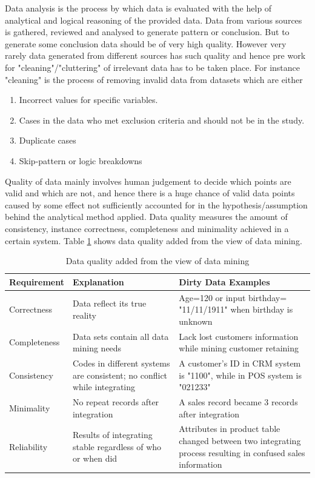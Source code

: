 \documentclass[article,type=msc,colorback,accentcolor=tud9c,twoside,11pt]{tudthesis}
\begin{document}
Data analysis is the process by which data is evaluated with the help of analytical and logical reasoning of the provided data. Data from various sources is gathered, reviewed and analysed to generate pattern or conclusion. But to generate some conclusion data should be of very high quality. However very rarely data generated from different sources has such quality and hence pre work for "cleaning"/"cluttering" of irrelevant data has to be taken place. For instance "cleaning" is the process of removing invalid data from datasets which are either
\begin{enumerate}
	\item Incorrect values for specific variables.
	\item Cases in the data who met exclusion criteria and should not be in the study.
	\item Duplicate cases
	\item Skip-pattern or logic breakdowns
\end{enumerate}
 Quality of data mainly involves human judgement to decide which points are valid and which are not, and hence there is a huge chance of valid data points caused by some effect not sufficiently accounted for in the hypothesis/assumption behind the analytical method applied. Data quality measures the amount of consistency, instance correctness, completeness and minimality achieved in a certain system. Table \ref{DataQuality} \cite{Dataquality} shows data quality added from the view of data mining.

\begin{table}[H]
	\centering
	\begin{tabular}{|p{3cm}|p{5cm}|p{7cm}|}
		\hline
		\textbf{Requirement} & \textbf{Explanation} & \textbf{Dirty Data Examples} 
	\\ \hline
		Correctness   & Data reflect its true reality             & Age=120 or input birthday= "11/11/1911" when birthday is unknown\\ \hline
		
	Completeness   & Data sets contain all data mining needs & Lack lost customers information while mining customer retaining\\ \hline
	
	Consistency  & Codes in different systems are consistent; no conflict while
	integrating  & A customer’s ID in CRM system is "1100", while in POS system is "021233"\\ \hline
	
	Minimality  & No repeat records after integration  &A sales record became 3 records after integration\\ \hline
	
	Reliability  & Results of integrating stable regardless of who or when did  & Attributes in product table changed between two integrating process resulting in confused sales information\\ \hline		
	\end{tabular}
	\caption{Data quality added from the view of data mining}
	\label{DataQuality}
\end{table}
\end{document}
